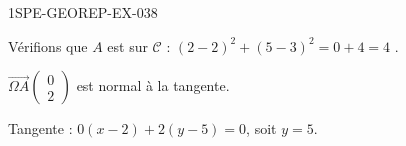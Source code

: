 \begin{corrige}{1SPE-GEOREP-EX-038}


Vérifions que $A$ est sur $\mathcal{C}$ : $(2-2)^2 + (5-3)^2 = 0 + 4 = 4$ \checkmark.

$\vec{\Omega A}\begin{pmatrix} 0 \\ 2 \end{pmatrix}$ est normal à la tangente.

Tangente : $0(x - 2) + 2(y - 5) = 0$, soit $\boxed{y = 5}$.

\end{corrige}
